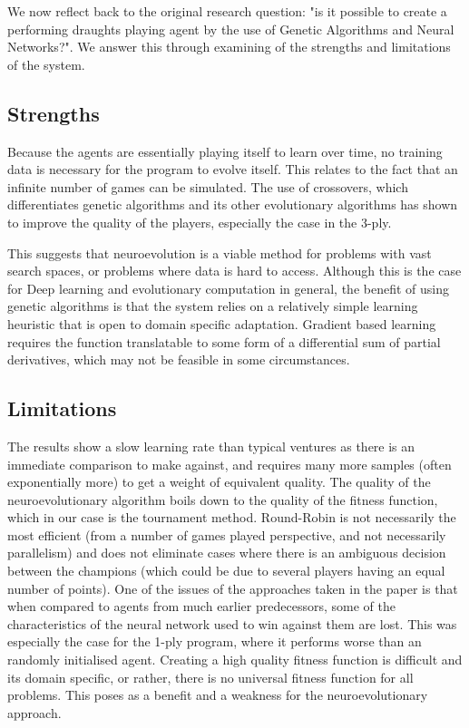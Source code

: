 \documentclass[12pt,a4paper]{article}
\begin{document}
    We now reflect back to the original research question: "is it possible to create a performing draughts playing agent by the use of Genetic Algorithms and Neural Networks?".  We answer this through examining of the strengths and limitations of the system. 

    \subsection{Strengths}
    Because the agents are essentially playing itself to learn over time, no training data is necessary for the program to evolve itself. This relates to the fact that an infinite number of games can be simulated. The use of crossovers, which differentiates genetic algorithms and its other evolutionary algorithms has shown to improve the quality of the players, especially the case in the 3-ply.
    
    This suggests that neuroevolution is a viable method for problems with vast search spaces, or problems where data is hard to access. Although this is the case for Deep learning and evolutionary computation in general, the benefit of using genetic algorithms is that the system relies on a relatively simple learning heuristic that is open to domain specific adaptation. Gradient based learning requires the function  translatable to some form of a differential sum of partial derivatives, which may not be feasible in some circumstances.

    \subsection{Limitations}
    The results show a slow learning rate than typical ventures as there is an immediate comparison to make against, and requires many more samples (often exponentially more) to get a weight of equivalent quality.
    The quality of the neuroevolutionary algorithm boils down to the quality of the fitness function, which in our case is the tournament method. Round-Robin is not necessarily the most efficient (from a number of games played perspective, and not necessarily parallelism) and does not eliminate cases where there is an ambiguous decision between the champions (which could be due to several players having an equal number of points). One of the issues of the approaches taken in the paper is that when compared to agents from much earlier predecessors, some of the characteristics of the neural network used to win against them are lost. This was especially the case for the 1-ply program, where it performs worse than an randomly initialised agent. Creating a high quality fitness function is difficult and its domain specific, or rather, there is no universal fitness function for all problems. This poses as a benefit and a weakness for the neuroevolutionary approach.
   
\end{document}
